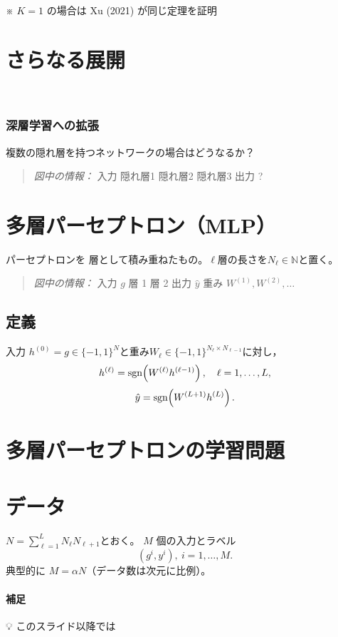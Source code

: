 \documentclass[uplatex,dvipdfmx,11pt,a4paper,openany]{bxjsbook}
\newenvironment{figuretext}{\begin{quote}\small\color{black!65}\emph{図中の情報：}}{\end{quote}}
\begin{document}
\allowbreak{}

※ \( K = 1 \) の場合は Xu (2021) が同じ定理を証明


\section{さらなる展開}
🧠

\subsubsection{深層学習への拡張}
複数の隠れ層を持つネットワークの場合はどうなるか？

\begin{figuretext}
入力 \quad 隠れ層1 \quad 隠れ層2 \quad 隠れ層3 \quad 出力 \quad ?
\end{figuretext}

\section{多層パーセプトロン（MLP）}
パーセプトロンを 層として積み重ねたもの。$\ell$層の長さを$N_\ell\in \mathbb N$と置く。

\begin{figuretext}
入力 \( g \) \quad 層 1 \quad 層 2 \quad 出力 \( \hat y \) \quad 重み \( W^{(1)}, W^{(2)}, \dots \)
\end{figuretext}

\subsection{定義}
入力 \(h^{(0)}=g \in \{-1,1\}^N\)と重み$W_\ell\in \{-1,1\}^{N_\ell \times N_{\ell-1}}$に対し，
      \[h^{(\ell)}={\rm sgn}\!\left(W^{(\ell)} h^{(\ell-1)}\right),\quad \ell=1,\dots,L,\]
      \[\hat y={\rm sgn}\!\left(W^{(L+1)} h^{(L)}\right).\]

\section{多層パーセプトロンの学習問題}
\section{データ}
\(N=\sum_{\ell=1}^{L} N_{\ell}N_{\ell+1}\)とおく。\allowbreak{} 
        \( M \) 個の入力とラベル\allowbreak{} 
        \[(g^i, y^i),\ i=1,\dots,M.\]
        典型的に \( M=\alpha N \)（データ数は次元に比例）。

\paragraph{補足}
💡 このスライド以降では
\end{document}
